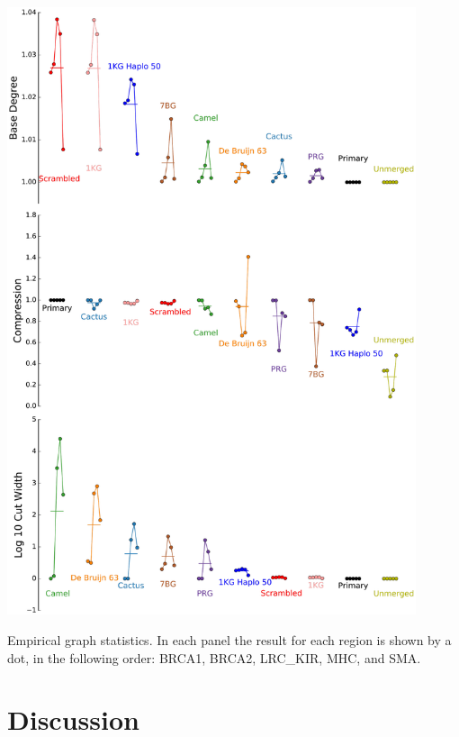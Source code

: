 \begin{FPfigure}
\centering
\includegraphics[width=0.9\textwidth]{figures/04_bakeoff/figure07.png}
\caption[Empirical graph statistics]{Empirical graph statistics. In each panel the result for each
region is shown by a dot, in the following order: BRCA1, BRCA2,
LRC\_KIR, MHC, and SMA.}
\label{fig:bakeoff:graphstats}
\end{FPfigure}

\section{Discussion}

